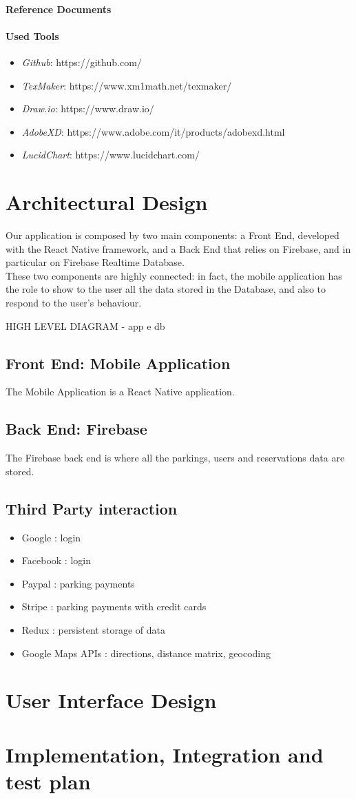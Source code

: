 \documentclass[11pt]{article} %
\begin{document}
\paragraph{Reference Documents}


\paragraph{Used Tools}
\begin{itemize}
\item \textit{Github}: https://github.com/
\item \textit{TexMaker}: https://www.xm1math.net/texmaker/
\item \textit{Draw.io}: https://www.draw.io/
\item \textit{AdobeXD}: https://www.adobe.com/it/products/adobexd.html
\item \textit{LucidChart}: https://www.lucidchart.com/
\end{itemize}


\section{Architectural Design}
Our application is composed by two main components: a Front End, developed with the React Native framework, and a Back End that relies on Firebase, and in particular on Firebase Realtime Database.\\
These two components are highly connected: in fact, the mobile application has the role to show to the user all the data stored in the Database, and also to respond to the user's behaviour.

HIGH LEVEL DIAGRAM - app e db

\subsection{Front End: Mobile Application}
The Mobile Application is a React Native application.

\subsection{Back End: Firebase}
The Firebase back end is where all the parkings, users and reservations data are stored. 

\subsection{Third Party interaction}
\begin{itemize}
\item Google : login
\item Facebook : login
\item Paypal : parking payments
\item Stripe : parking payments with credit cards
\item Redux : persistent storage of data
\item Google Maps APIs : directions, distance matrix, geocoding
\end{itemize}

\section{User Interface Design}


\section{Implementation, Integration and test plan}
\end{document}
